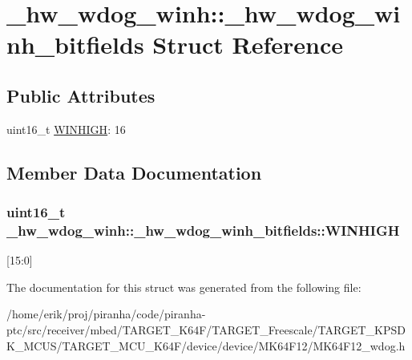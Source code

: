 \hypertarget{struct__hw__wdog__winh_1_1__hw__wdog__winh__bitfields}{}\section{\+\_\+hw\+\_\+wdog\+\_\+winh\+:\+:\+\_\+hw\+\_\+wdog\+\_\+winh\+\_\+bitfields Struct Reference}
\label{struct__hw__wdog__winh_1_1__hw__wdog__winh__bitfields}
\subsection*{Public Attributes}
\begin{DoxyCompactItemize}
\item 
uint16\+\_\+t \hyperlink{struct__hw__wdog__winh_1_1__hw__wdog__winh__bitfields_a5813ba5af85c6dc356d1dc017606620d}{W\+I\+N\+H\+I\+GH}\+: 16
\end{DoxyCompactItemize}


\subsection{Member Data Documentation}
\subsubsection[{\texorpdfstring{W\+I\+N\+H\+I\+GH}{WINHIGH}}]{\setlength{\rightskip}{0pt plus 5cm}uint16\+\_\+t \+\_\+hw\+\_\+wdog\+\_\+winh\+::\+\_\+hw\+\_\+wdog\+\_\+winh\+\_\+bitfields\+::\+W\+I\+N\+H\+I\+GH}\hypertarget{struct__hw__wdog__winh_1_1__hw__wdog__winh__bitfields_a5813ba5af85c6dc356d1dc017606620d}{}\label{struct__hw__wdog__winh_1_1__hw__wdog__winh__bitfields_a5813ba5af85c6dc356d1dc017606620d}
\mbox{[}15\+:0\mbox{]} 

The documentation for this struct was generated from the following file\+:\begin{DoxyCompactItemize}
\item 
/home/erik/proj/piranha/code/piranha-\/ptc/src/receiver/mbed/\+T\+A\+R\+G\+E\+T\+\_\+\+K64\+F/\+T\+A\+R\+G\+E\+T\+\_\+\+Freescale/\+T\+A\+R\+G\+E\+T\+\_\+\+K\+P\+S\+D\+K\+\_\+\+M\+C\+U\+S/\+T\+A\+R\+G\+E\+T\+\_\+\+M\+C\+U\+\_\+\+K64\+F/device/device/\+M\+K64\+F12/M\+K64\+F12\+\_\+wdog.\+h\end{DoxyCompactItemize}
